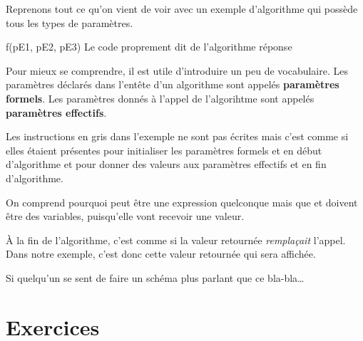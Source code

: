 	Reprenons tout ce qu'on vient de voir
	avec un exemple d'algorithme qui possède tous les types de paramètres.

	\begin{LDA}
			\Write f(pE1, pE2, pE3)
		\EndAlgo
		\Empty
			\Empty
			\LComment Le code proprement dit de l'algorithme
			\Empty
			\Return réponse
		\EndAlgo
	\end{LDA}

	Pour mieux se comprendre,
	il est utile d'introduire un peu de vocabulaire.
	Les paramètres déclarés dans l'entête d'un algorithme
	sont appelés \textbf{paramètres formels}.
	Les paramètres donnés à l'appel de l'algorihtme
	sont appelés \textbf{paramètres effectifs}. 
	
	Les instructions en gris dans l'exemple ne sont pas écrites
	mais c'est comme si elles étaient présentes
	pour initialiser les paramètres formels \In{} et \InOut{}
	en début d'algorithme
	et pour donner des valeurs 
	aux paramètres effectifs \Out{} et \InOut{}
	en fin d'algorithme.
	
	On comprend pourquoi  peut être une expression quelconque
	mais que  et  doivent être des variables,
	puisqu'elle vont recevoir une valeur.
	
	À la fin de l'algorithme, 
	c'est comme si la valeur retournée \emph{remplaçait} l'appel.
	Dans notre exemple, c'est donc cette valeur retournée
	qui sera affichée.

	\begin{TODO}
		Si quelqu'un se sent de faire un schéma 
		plus parlant que ce bla-bla\dots
	\end{TODO}
	
\section{Exercices}

